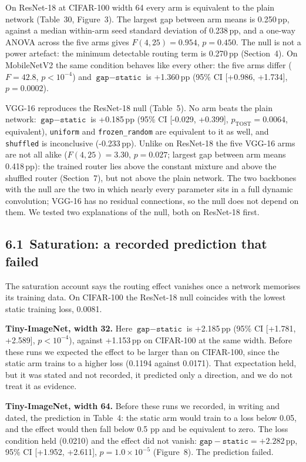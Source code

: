 \documentclass{article}
\begin{document}
On ResNet-18 at CIFAR-100 width 64 every arm is equivalent to the plain
network (Table~30, Figure~3). The largest gap
between arm means is 0.250\,pp, against a median within-arm seed
standard deviation of 0.238\,pp, and a one-way ANOVA across the five
arms gives $F(4,25)=0.954$, $p=0.450$. The null is not a power
artefact: the minimum detectable routing term is 0.270\,pp
(Section~4). On MobileNetV2 the same condition behaves like
every other: the five arms differ ($F=42.8$, $p<10^{-4}$) and
$\texttt{gap}-\texttt{static}$ is +1.360\,pp (95\% CI
[+0.986, +1.734], $p=0.0002$).

VGG-16 reproduces the ResNet-18 null (Table~5). No arm beats
the plain network: $\texttt{gap}-\texttt{static}$ is +0.185\,pp
(95\% CI [-0.029, +0.399],
$p_{\text{TOST}}=0.0064$, equivalent), \texttt{uniform} and
\texttt{frozen\_random} are equivalent to it as well, and
\texttt{shuffled} is inconclusive (-0.233\,pp). Unlike on
ResNet-18 the five VGG-16 arms are not all alike ($F(4,25)=3.30$,
$p=0.027$; largest gap between arm means 0.418\,pp): the
trained router lies above the constant mixture and above the shuffled
router (Section~7), but not above the plain network. The
two backbones with the null are the two in which nearly every parameter
sits in a full dynamic convolution; VGG-16 has no residual connections,
so the null does not depend on them. We tested two explanations of the
null, both on ResNet-18 first.

\subsection*{6.1 Saturation: a recorded prediction that failed}

The saturation account says the routing effect vanishes once a network
memorises its training data. On CIFAR-100 the ResNet-18 null coincides
with the lowest static training loss, 0.0081.

\textbf{Tiny-ImageNet, width 32.}  Here $\texttt{gap}-\texttt{static}$
is +2.185\,pp (95\% CI [+1.781, +2.589],
$p<10^{-4}$), against +1.153\,pp on CIFAR-100 at the same width.
Before these runs we expected the effect to be larger than on CIFAR-100,
since the static arm trains to a higher loss (0.1194 against
0.0171). That expectation held, but it was stated and not recorded,
it predicted only a direction, and we do not treat it as evidence.

\textbf{Tiny-ImageNet, width 64.}  Before these runs we recorded, in
writing and dated, the prediction in Table~4: the static
arm would train to a loss below 0.05, and the effect would then fall below
0.5 pp and be equivalent to zero. The loss condition held
(0.0210) and the effect did not vanish:
$\texttt{gap}-\texttt{static}=+2.282$\,pp, 95\% CI
[+1.952, +2.611], $p=1.0\times10^{-5}$ (Figure~8). The
prediction failed.
\end{document}
